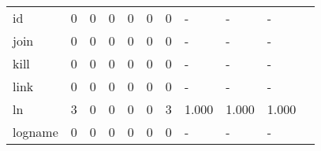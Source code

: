 \begin{longtable}{lp{1.2cm}p{1.2cm}p{1.2cm}p{1.2cm}p{1.2cm}p{1.2cm}p{1.2cm}p{1.2cm}p{1.2cm}p{1.2cm}}
id        &                                     0 &                                                  0 &                                                  0 &                                                  0 &                                                  0 &                                                  0 &                                                  - &                                                  - &                                                  - \\
join      &                                     0 &                                                  0 &                                                  0 &                                                  0 &                                                  0 &                                                  0 &                                                  - &                                                  - &                                                  - \\
kill      &                                     0 &                                                  0 &                                                  0 &                                                  0 &                                                  0 &                                                  0 &                                                  - &                                                  - &                                                  - \\
link      &                                     0 &                                                  0 &                                                  0 &                                                  0 &                                                  0 &                                                  0 &                                                  - &                                                  - &                                                  - \\
ln        &                                     3 &                                                  0 &                                                  0 &                                                  0 &                                                  0 &                                                  3 &                                              1.000 &                                              1.000 &                                              1.000 \\
logname   &                                     0 &                                                  0 &                                                  0 &                                                  0 &                                                  0 &                                                  0 &                                                  - &                                                  - &                                                  - \\

\end{longtable}
